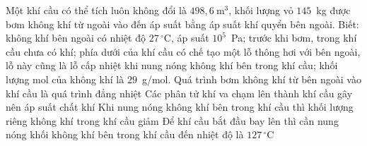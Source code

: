 	\begin{ex}%
		Một khí cầu có thể tích luôn không đổi là $498{,}6~\text{m}^3$, khối lượng vỏ $145$~kg được bơm không khí từ ngoài vào đến áp suất bằng áp suất khí quyển bên ngoài. Biết: không khí bên ngoài có nhiệt độ $27\,^\circ\text{C}$, áp suất $10^5$~Pa; trước khi bơm, trong khí cầu chưa có khí; phía dưới của khí cầu có chế tạo một lỗ thông hơi với bên ngoài, lỗ này cũng là lỗ cấp nhiệt khi nung nóng không khí bên trong khí cầu; khối lượng mol của không khí là $29$~g/mol.
		\choiceTFt
		{Quá trình bơm không khí từ bên ngoài vào khí cầu là quá trình đẳng nhiệt}
		{\True Các phân tử khí va chạm lên thành khí cầu gây nên áp suất chất khí}
		{\True Khi nung nóng không khí bên trong khí cầu thì khối lượng riêng không khí trong khí cầu giảm}
		{\True Để khí cầu bắt đầu bay lên thì cần nung nóng khối không khí bên trong khí cầu đến nhiệt độ là $127\,^\circ\text{C}$}
	\end{ex}

